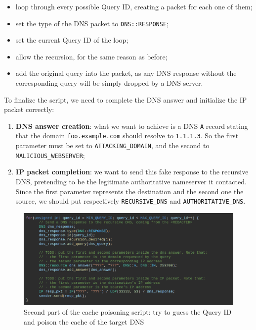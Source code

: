 \documentclass[11pt,a4paper]{article}
\begin{document}
\begin{itemize}
    \item loop through every possible Query ID, creating a packet for each one of them;
    \item set the type of the DNS packet to \texttt{DNS::RESPONSE};
    \item set the current Query ID of the loop;
    \item allow the recursion, for the same reason as before;
    \item add the original query into the packet, as any DNS response without the corresponding query will be simply dropped by a DNS server.
\end{itemize}

\noindent
To finalize the script, we need to complete the DNS answer and initialize the IP packet correctly:
\begin{enumerate}
    \item \textbf{DNS answer creation}: what we want to achieve is a DNS \texttt{A} record stating that the domain \texttt{foo.example.com} should resolve to \texttt{1.1.1.3}. So the first parameter must be set to \texttt{ATTACKING\_DOMAIN}, and the second to \texttt{MALICIOUS\_WEBSERVER};
    \item \textbf{IP packet completion}: we want to send this fake response to the recursive DNS, pretending to be the legitimate authoritative nameserver it contacted. Since the first parameter represents the destination and the second one the source, we should put respectively \texttt{RECURSIVE\_DNS} and \texttt{AUTHORITATIVE\_DNS}.
\end{enumerate}

\begin{figure}[h]
    \centering
    \includegraphics[width=\textwidth]{cache-poisoning-second.png}
    \caption{Second part of the cache poisoning script: try to guess the Query ID and poison the cache of the target DNS}
    \label{fig:cache-poisoning-second}
\end{figure}
\end{document}
